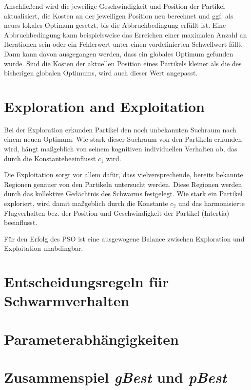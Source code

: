 Anschließend wird die jeweilige Geschwindigkeit und Position der Partikel
aktualisiert, die Kosten an der jeweiligen Position neu berechnet und ggf. als
neues lokales Optimum gesetzt, bis die Abbruchbedingung erfüllt ist. Eine
Abbruchbedingung kann beispielsweise das Erreichen einer maximalen Anzahl an
Iterationen sein oder ein Fehlerwert unter einen vordefinierten Schwellwert
fällt. Dann kann davon ausgegangen werden, dass ein globales Optimum gefunden
wurde. Sind die Kosten der aktuellen Position eines Partikels kleiner als die
des bisherigen globalen Optimums, wird auch dieser Wert angepasst.

\section{Exploration and Exploitation}

Bei der Exploration erkunden Partikel den noch unbekannten Suchraum nach einem
neuen Optimum. Wie stark dieser Suchraum von den Partikeln erkunden wird, hängt
maßgeblich von seinem kognitiven individuellen Verhalten ab, das durch die
Konstantebeeinflusst $c_1$ wird.

Die Exploitation sorgt vor allem dafür, dass vielversprechende, bereits
bekannte Regionen genauer von den Partikeln untersucht werden. Diese Regionen
werden durch das kollektive Gedächtnis des Schwarms festgelegt. Wie stark ein
Partikel exploriert, wird damit maßgeblich durch die Konstante $c_2$ und das
harmonisierte Flugverhalten bez. der Position und Geschwindigkeit der Partikel
(Intertia) beeinflusst.

Für den Erfolg des PSO ist eine ausgewogene Balance zwischen Exploration und
Exploitation unabdingbar.

\section{Entscheidungsregeln für Schwarmverhalten}

\section{Parameterabhängigkeiten}

\section{Zusammenspiel \emph{gBest} und \emph{pBest}}